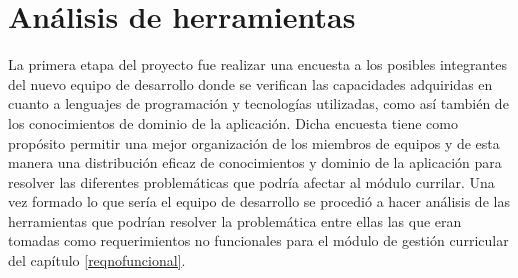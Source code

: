 \section{Análisis de herramientas}
La primera etapa del proyecto fue realizar una encuesta a los posibles integrantes del nuevo equipo de desarrollo donde se verifican las capacidades adquiridas en cuanto a lenguajes de programación y tecnologías utilizadas, como así también de los conocimientos de dominio de la aplicación.
Dicha encuesta tiene como propósito permitir una mejor organización de los miembros de equipos y de esta manera una distribución eficaz de conocimientos y dominio de la aplicación para resolver las diferentes problemáticas que podría afectar al módulo currilar.
Una vez formado lo que sería el equipo de desarrollo se procedió a hacer análisis de las herramientas que podrían resolver la problemática entre ellas las que eran tomadas como requerimientos no funcionales para el módulo de gestión curricular del capítulo \ref{reqnofuncional}.